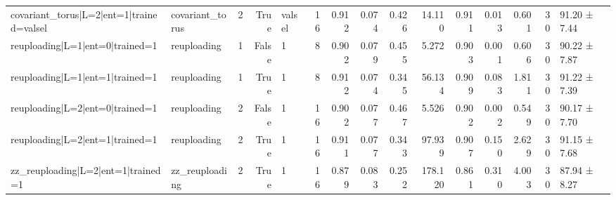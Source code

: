 \begin{table}
\begin{tabular}{llrrlrrrrrrrrrl}
covariant\_torus|L=2|ent=1|trained=valsel & covariant\_torus & 2 & True & valsel & 16 & 0.912 & 0.074 & 0.426 & 14.110 & 0.911 & 0.013 & 0.601 & 30 & 91.20 ± 7.44 \\
reuploading|L=1|ent=0|trained=1 & reuploading & 1 & False & 1 & 8 & 0.902 & 0.079 & 0.455 & 5.272 & 0.903 & 0.001 & 0.606 & 30 & 90.22 ± 7.87 \\
reuploading|L=1|ent=1|trained=1 & reuploading & 1 & True & 1 & 8 & 0.912 & 0.074 & 0.345 & 56.134 & 0.909 & 0.083 & 1.811 & 30 & 91.22 ± 7.39 \\
reuploading|L=2|ent=0|trained=1 & reuploading & 2 & False & 1 & 16 & 0.902 & 0.077 & 0.467 & 5.526 & 0.902 & 0.002 & 0.549 & 30 & 90.17 ± 7.70 \\
reuploading|L=2|ent=1|trained=1 & reuploading & 2 & True & 1 & 16 & 0.911 & 0.077 & 0.343 & 97.939 & 0.907 & 0.150 & 2.629 & 30 & 91.15 ± 7.68 \\
zz\_reuploading|L=2|ent=1|trained=1 & zz\_reuploading & 2 & True & 1 & 16 & 0.879 & 0.083 & 0.252 & 178.120 & 0.861 & 0.310 & 4.003 & 30 & 87.94 ± 8.27 \\
\bottomrule
\end{tabular}
\end{table}
